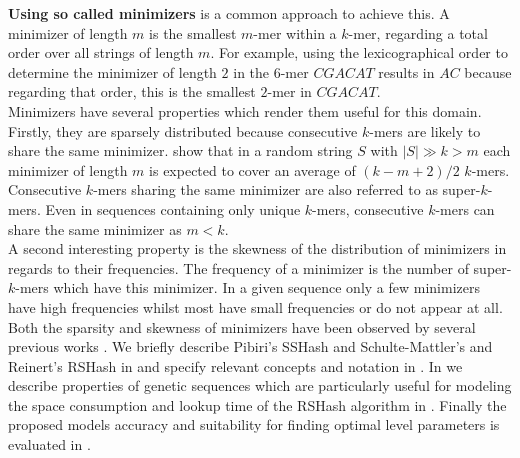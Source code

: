 \documentclass[a4paper,titlepage,onecolumn,oneside,12pt,nenglish,titlepage=firstiscover]{scrbook}
\theoremstyle{plain} %
\theoremstyle{definition} %
\theoremstyle{remark} %
\theoremstyle{plain}
\newcommand{\minimizerLength}{m}
\begin{document}
\textbf{Using so called minimizers} is a common approach to achieve this. A minimizer of length $\minimizerLength$ is the smallest $\minimizerLength$-mer within a $k$-mer, regarding a total order over all strings of length $\minimizerLength$. For example, using the lexicographical order to determine the minimizer of length $2$ in the $6$-mer $CGACAT$ results in $AC$ because regarding that order, this is the smallest $2$-mer in $CGACAT$.\\
Minimizers have several properties which render them useful for this domain. Firstly, they are sparsely distributed because consecutive $k$-mers are likely to share the same minimizer.  show that in a random string $S$ with $|S| \gg k > \minimizerLength$ each minimizer of length $\minimizerLength$ is expected to cover an average of $(k-\minimizerLength+2)/2$ $k$-mers. Consecutive $k$-mers sharing the same minimizer are also referred to as super-$k$-mers. Even in sequences containing only unique $k$-mers, consecutive $k$-mers can share the same minimizer as $\minimizerLength < k$.\\
A second interesting property is the skewness of the distribution of minimizers in regards to their frequencies. The frequency of a minimizer is the number of super-$k$-mers which have this minimizer. In a given sequence only a few minimizers have high frequencies whilst most have small frequencies or do not appear at all.\\

Both the sparsity and skewness of minimizers have been observed by several previous works \cite{schulte-mattler_rshash_2026, pibiri_sparse_2022, jain_weighted_2020, chikhi_representation_2014}. We briefly describe Pibiri's SSHash \cite{pibiri_sparse_2022} and Schulte-Mattler's and Reinert's RSHash \cite{schulte-mattler_rshash_2026} in  and specify relevant concepts and notation in . In  we describe properties of genetic sequences which are particularly useful for modeling the space consumption and lookup time of the RSHash algorithm in . Finally the proposed models accuracy and suitability for finding optimal level parameters is evaluated in .
\end{document}
